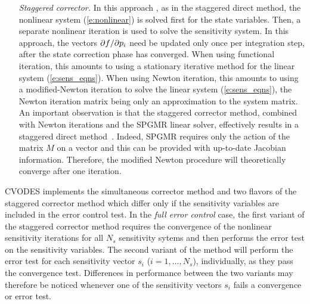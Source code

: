\begin{itemize}
\item[{\em Staggered corrector.}] In this approach \cite{FTB:97}, as in the staggered direct method,
  the nonlinear system (\ref{e:nonlinear}) is solved first for the state variables.
  Then, a separate nonlinear iteration is used to solve the sensitivity system.
  In this approach, the vectors $\partial f / \partial p_i$ need be updated only once per integration step, 
  after the state correction phase has converged. 
  When using functional iteration, this amounts to using a stationary iterative method for
  the linear system (\ref{e:sens_eqns}). When using Newton iteration, this amounts to 
  using a modified-Newton iteration to solve the linear system (\ref{e:sens_eqns}), 
  the Newton iteration matrix being only an approximation to the system matrix.
  An important observation is that the staggered corrector method, combined with 
  Newton iterations and the SPGMR linear solver, effectively results in a staggered direct 
  method~\cite{Toc:01}.
  Indeed, SPGMR requires only the action of the matrix $M$ on a vector and
  this can be provided with up-to-date Jacobian information. Therefore, the
  modified Newton procedure will theoretically converge 
  after one iteration.

\end{itemize}  
CVODES implements the simultaneous corrector method and two flavors of the 
staggered corrector method which differ only if the sensitivity variables are
included in the error control test.
In the {\em full error control} case, 
the first variant of the staggered corrector method requires the convergence of 
the nonlinear sensitivity iterations for all $N_s$ sensitivity sytems and then 
performs the error test on the sensitivity variables. The second variant of the method
will perform the error test for each sensitivity vector $s_i$ ($i=1,\ldots,N_s$),
individually, as they pass the convergence test. Differences in performance
between the two variants may therefore be noticed whenever one of the sensitivity 
vectors $s_i$ fails a convergence or error test. 

